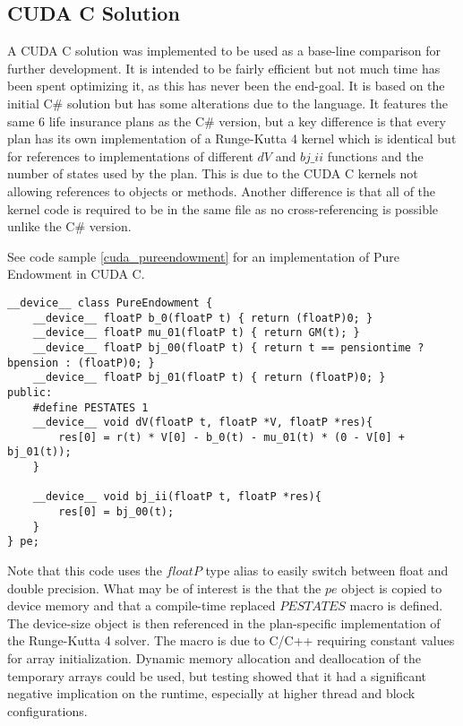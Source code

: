 \subsection{CUDA C Solution}
A CUDA C solution was implemented to be used as a base-line comparison for further development.
It is intended to be fairly efficient but not much time has been spent optimizing it, as this has never been the end-goal.
It is based on the initial C\# solution but has some alterations due to the language.
It features the same 6 life insurance plans as the C\# version, but a key difference is that every plan has its own implementation of a Runge-Kutta 4 kernel which is identical but for references to implementations of different $dV$ and $bj\_ii$ functions and the number of states used by the plan.
This is due to the CUDA C kernels not allowing references to objects or methods. %
Another difference is that all of the kernel code is required to be in the same file as no cross-referencing is possible unlike the C\# version.

See code sample \ref{cuda_pureendowment} for an implementation of Pure Endowment in CUDA C.
\begin{lstlisting}[language=cudac, caption=The pure endowment insurance plan expressed in CUDA C, label=cuda_pureendowment]
__device__ class PureEndowment {
	__device__ floatP b_0(floatP t) { return (floatP)0; }
	__device__ floatP mu_01(floatP t) { return GM(t); }
	__device__ floatP bj_00(floatP t) { return t == pensiontime ? bpension : (floatP)0; }
	__device__ floatP bj_01(floatP t) { return (floatP)0; }
public:
	#define PESTATES 1
	__device__ void dV(floatP t, floatP *V, floatP *res){ 
		res[0] = r(t) * V[0] - b_0(t) - mu_01(t) * (0 - V[0] + bj_01(t));
	}

	__device__ void bj_ii(floatP t, floatP *res){
		res[0] = bj_00(t);
	}
} pe;
\end{lstlisting}

Note that this code uses the $floatP$ type alias to easily switch between float and double precision.
What may be of interest is the that the $pe$ object is copied to device memory and that a compile-time replaced $PESTATES$ macro is defined.
The device-size object is then referenced in the plan-specific implementation of the Runge-Kutta 4 solver.
The macro is due to C/C++ requiring constant values for array initialization.
Dynamic memory allocation and deallocation of the temporary arrays could be used, but testing showed that it had a significant negative implication on the runtime, especially at higher thread and block configurations.

